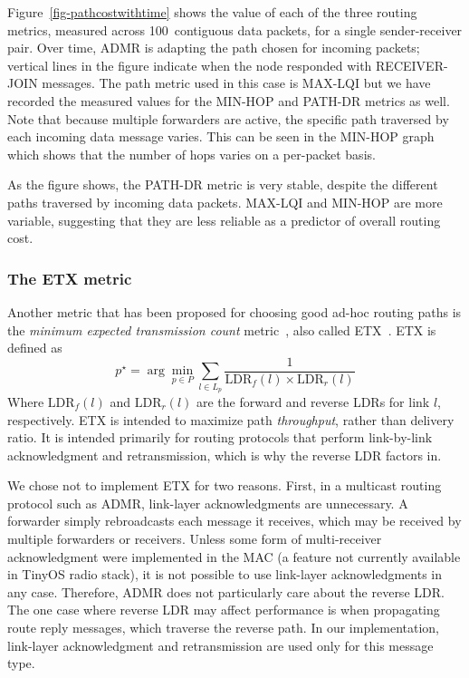 Figure~\ref{fig-pathcostwithtime} shows the value of each of the
three routing metrics, measured across 100~contiguous data packets,
for a single sender-receiver pair. Over time, ADMR is adapting the
path chosen for incoming packets; vertical lines in the figure indicate 
when the node responded with RECEIVER-JOIN messages. The path metric
used in this case is MAX-LQI but we have recorded the measured
values for the MIN-HOP and PATH-DR metrics as well. Note that because
multiple forwarders are active, the specific path traversed by each
incoming data message varies. This can be seen in the MIN-HOP graph 
which shows that the number of hops varies on a per-packet basis.

As the figure shows, the PATH-DR metric is very stable, despite the
different paths traversed by incoming data packets.  MAX-LQI and MIN-HOP
are more variable, suggesting that they are less reliable as a
predictor of overall routing cost.

\subsubsection{The ETX metric}

Another metric 
that has been proposed for choosing good ad-hoc routing paths is the 
{\em minimum expected transmission count} metric~\cite{awoo-multihop}, 
also called ETX~\cite{etx}. ETX is defined as
\[
  p^\star = \arg \min_{p \in P} \sum_{l \in L_p} 
  \frac{1}{\mathrm{LDR}_f(l) \times \mathrm{LDR}_r(l)}
\]
Where $\mathrm{LDR}_f(l)$ and $\mathrm{LDR}_r(l)$ are the 
forward and reverse LDRs for link $l$, respectively.
ETX is intended to maximize path {\em throughput}, rather than
delivery ratio. It is intended primarily for routing protocols
that perform link-by-link acknowledgment and retransmission,
which is why the reverse LDR factors in.

We chose not to implement ETX for two reasons. First, in a multicast
routing protocol such as ADMR, link-layer acknowledgments are 
unnecessary. A forwarder simply rebroadcasts each message it receives, 
which may be received by multiple forwarders or receivers. Unless
some form of multi-receiver acknowledgment were implemented in the
MAC (a feature not currently available in TinyOS radio stack), it is 
not possible to use link-layer acknowledgments in any case. Therefore,
ADMR does not particularly care about the reverse LDR.  The one case
where reverse LDR may affect performance is when propagating
route reply messages, which traverse the reverse path. In our
implementation, link-layer acknowledgment and retransmission are
used only for this message type.

